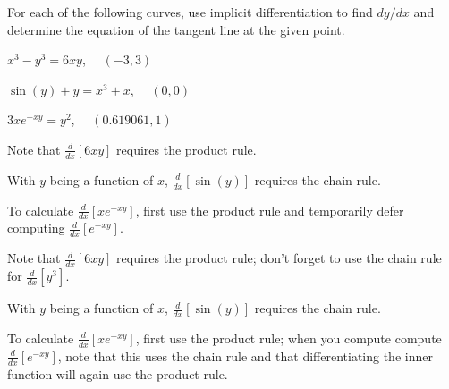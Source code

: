 \begin{activity} \label{A:2.7.3}  
  For each of the following curves, use implicit differentiation to find $dy/dx$ and determine the equation of the tangent line at the given point.
  	\ba
		\item $x^3 - y^3 = 6xy$, \ \ $(-3,3)$
		\item $\sin(y) + y = x^3 + x$, \ \ $(0,0)$
		\item $3x e^{-xy} = y^2$, \ \ $(0.619061,1)$
	\ea
\end{activity}
\begin{smallhint}
\ba
	\item Note that $\frac{d}{dx}[6xy]$ requires the product rule.
	\item With $y$ being a function of $x$, $\frac{d}{dx}[\sin(y)]$ requires the chain rule.
	\item To calculate $\frac{d}{dx}[x e^{-xy}]$, first use the product rule and temporarily defer computing $\frac{d}{dx}[e^{-xy}]$.
\ea
\end{smallhint}
\begin{bighint}
\ba
	\item Note that $\frac{d}{dx}[6xy]$ requires the product rule; don't forget to use the chain rule for $\frac{d}{dx}[y^3]$.
	\item With $y$ being a function of $x$, $\frac{d}{dx}[\sin(y)]$ requires the chain rule.
	\item To calculate $\frac{d}{dx}[x e^{-xy}]$, first use the product rule; when you compute compute $\frac{d}{dx}[e^{-xy}]$, note that this uses the chain rule and that differentiating the inner function will again use the product rule.
\ea
\end{bighint}

